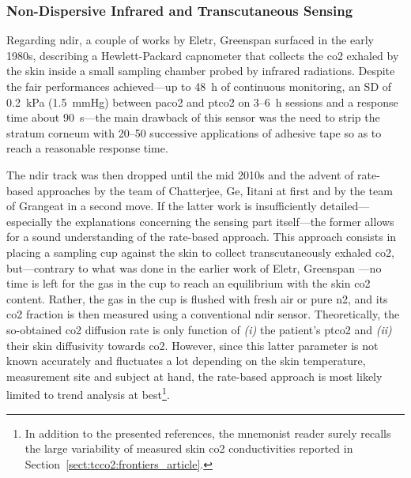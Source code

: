 \subsubsection{Non-Dispersive Infrared and Transcutaneous Sensing}

Regarding \gls{ndir}, a couple of works by Eletr, Greenspan \etal{} surfaced in the early 1980s\cite{eletr1978, greenspan1981}, describing a Hewlett-Packard capnometer that collects the \gls{co2} exhaled by the skin inside a small sampling chamber probed by infrared radiations. Despite the fair performances achieved---up to 48~h of continuous monitoring, an SD of 0.2~kPa (1.5~mmHg) between \gls{paco2} and \gls{ptco2} on 3--6~h sessions and a response time about 90~s\cite{eletr1978}---the main drawback of this sensor was the need to strip the stratum corneum with 20--50 successive applications of adhesive tape so as to reach a reasonable response time.

The \gls{ndir} track was then dropped until the mid 2010s and the advent of rate-based approaches by the team of Chatterjee, Ge, Iitani \etal{}\cite{chatterjee2014, chatterjee2015, ge2018, iitani2021} at first and by the team of Grangeat \etal{}\cite{grangeat2019, grangeat2020} in a second move. If the latter work is insufficiently detailed---especially the explanations concerning the sensing part itself---the former allows for a sound understanding of the rate-based approach. This approach consists in placing a sampling cup against the skin to collect transcutaneously exhaled \gls{co2}, but---contrary to what was done in the earlier work of Eletr, Greenspan \etal{}---no time is left for the gas in the cup to reach an equilibrium with the skin \gls{co2} content. Rather, the gas in the cup is flushed with fresh air or pure \gls{n2}, and its \gls{co2} fraction is then measured using a conventional \gls{ndir} sensor. Theoretically, the so-obtained \gls{co2} diffusion rate is only function of \emph{(i)} the patient's \gls{ptco2} and \emph{(ii)} their skin diffusivity towards \gls{co2}\cite{chatterjee2015}. However, since this latter parameter is not known accurately and fluctuates a lot depending on the skin temperature\cite{shaw1930, scheuplein1976}, measurement site\cite{adamczyk1966, levshankov1983} and subject at hand\cite{ernstene1932a}, the rate-based approach is most likely limited to trend analysis at best\footnote{In addition to the presented references, the mnemonist reader surely recalls the large variability of measured skin \gls{co2} conductivities reported in Section~\ref{sect:tcco2:frontiers_article}.}.

